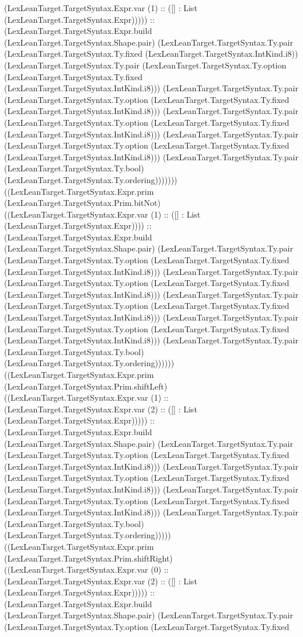 \documentclass[11pt]{article}
\begin{document}
(LexLeanTarget.TargetSyntax.Expr.var (1) :: ([] : List (LexLeanTarget.TargetSyntax.Expr))))) :: (LexLeanTarget.TargetSyntax.Expr.build (LexLeanTarget.TargetSyntax.Shape.pair) (LexLeanTarget.TargetSyntax.Ty.pair (LexLeanTarget.TargetSyntax.Ty.fixed (LexLeanTarget.TargetSyntax.IntKind.i8)) (LexLeanTarget.TargetSyntax.Ty.pair (LexLeanTarget.TargetSyntax.Ty.option (LexLeanTarget.TargetSyntax.Ty.fixed (LexLeanTarget.TargetSyntax.IntKind.i8))) (LexLeanTarget.TargetSyntax.Ty.pair (LexLeanTarget.TargetSyntax.Ty.option (LexLeanTarget.TargetSyntax.Ty.fixed (LexLeanTarget.TargetSyntax.IntKind.i8))) (LexLeanTarget.TargetSyntax.Ty.pair (LexLeanTarget.TargetSyntax.Ty.option (LexLeanTarget.TargetSyntax.Ty.fixed (LexLeanTarget.TargetSyntax.IntKind.i8))) (LexLeanTarget.TargetSyntax.Ty.pair (LexLeanTarget.TargetSyntax.Ty.option (LexLeanTarget.TargetSyntax.Ty.fixed (LexLeanTarget.TargetSyntax.IntKind.i8))) (LexLeanTarget.TargetSyntax.Ty.pair (LexLeanTarget.TargetSyntax.Ty.bool) (LexLeanTarget.TargetSyntax.Ty.ordering))))))) ((LexLeanTarget.TargetSyntax.Expr.prim (LexLeanTarget.TargetSyntax.Prim.bitNot) ((LexLeanTarget.TargetSyntax.Expr.var (1) :: ([] : List (LexLeanTarget.TargetSyntax.Expr)))) :: (LexLeanTarget.TargetSyntax.Expr.build (LexLeanTarget.TargetSyntax.Shape.pair) (LexLeanTarget.TargetSyntax.Ty.pair (LexLeanTarget.TargetSyntax.Ty.option (LexLeanTarget.TargetSyntax.Ty.fixed (LexLeanTarget.TargetSyntax.IntKind.i8))) (LexLeanTarget.TargetSyntax.Ty.pair (LexLeanTarget.TargetSyntax.Ty.option (LexLeanTarget.TargetSyntax.Ty.fixed (LexLeanTarget.TargetSyntax.IntKind.i8))) (LexLeanTarget.TargetSyntax.Ty.pair (LexLeanTarget.TargetSyntax.Ty.option (LexLeanTarget.TargetSyntax.Ty.fixed (LexLeanTarget.TargetSyntax.IntKind.i8))) (LexLeanTarget.TargetSyntax.Ty.pair (LexLeanTarget.TargetSyntax.Ty.option (LexLeanTarget.TargetSyntax.Ty.fixed (LexLeanTarget.TargetSyntax.IntKind.i8))) (LexLeanTarget.TargetSyntax.Ty.pair (LexLeanTarget.TargetSyntax.Ty.bool) (LexLeanTarget.TargetSyntax.Ty.ordering)))))) ((LexLeanTarget.TargetSyntax.Expr.prim (LexLeanTarget.TargetSyntax.Prim.shiftLeft) ((LexLeanTarget.TargetSyntax.Expr.var (1) :: (LexLeanTarget.TargetSyntax.Expr.var (2) :: ([] : List (LexLeanTarget.TargetSyntax.Expr))))) :: (LexLeanTarget.TargetSyntax.Expr.build (LexLeanTarget.TargetSyntax.Shape.pair) (LexLeanTarget.TargetSyntax.Ty.pair (LexLeanTarget.TargetSyntax.Ty.option (LexLeanTarget.TargetSyntax.Ty.fixed (LexLeanTarget.TargetSyntax.IntKind.i8))) (LexLeanTarget.TargetSyntax.Ty.pair (LexLeanTarget.TargetSyntax.Ty.option (LexLeanTarget.TargetSyntax.Ty.fixed (LexLeanTarget.TargetSyntax.IntKind.i8))) (LexLeanTarget.TargetSyntax.Ty.pair (LexLeanTarget.TargetSyntax.Ty.option (LexLeanTarget.TargetSyntax.Ty.fixed (LexLeanTarget.TargetSyntax.IntKind.i8))) (LexLeanTarget.TargetSyntax.Ty.pair (LexLeanTarget.TargetSyntax.Ty.bool) (LexLeanTarget.TargetSyntax.Ty.ordering))))) ((LexLeanTarget.TargetSyntax.Expr.prim (LexLeanTarget.TargetSyntax.Prim.shiftRight) ((LexLeanTarget.TargetSyntax.Expr.var (0) :: (LexLeanTarget.TargetSyntax.Expr.var (2) :: ([] : List (LexLeanTarget.TargetSyntax.Expr))))) :: (LexLeanTarget.TargetSyntax.Expr.build (LexLeanTarget.TargetSyntax.Shape.pair) (LexLeanTarget.TargetSyntax.Ty.pair (LexLeanTarget.TargetSyntax.Ty.option (LexLeanTarget.TargetSyntax.Ty.fixed 
\end{document}
